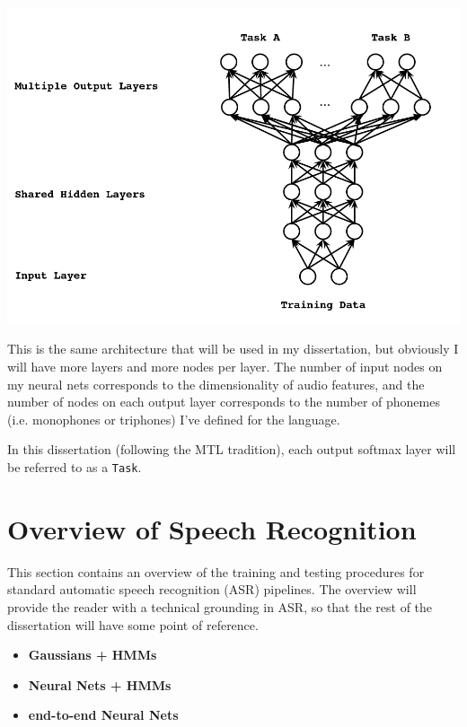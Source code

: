\documentclass[10pt,a4paper]{article}
\begin{document}
\begin{center}
\includegraphics[width=.85\textwidth,keepaspectratio]{figs/heigold-2013-dnn-c.png}
\end{center}

This is the same architecture that will be used in my dissertation, but obviously I will have more layers and more nodes per layer. The number of input nodes on my neural nets corresponds to the dimensionality of audio features, and the number of nodes on each output layer corresponds to the number of phonemes (i.e. monophones or triphones) I've defined for the language.

In this dissertation (following the MTL tradition), each output softmax layer will be referred to as a \texttt{Task}.
\section{Overview of Speech Recognition}

This section contains an overview of the training and testing procedures for standard automatic speech recognition (ASR) pipelines. The overview will provide the reader with a technical grounding in ASR, so that the rest of the dissertation will have some point of reference. 


\begin{itemize}

\item \textbf{Gaussians + HMMs}
  
\item \textbf{Neural Nets + HMMs}
  
\item \textbf{end-to-end Neural Nets}

\end{itemize}
\end{document}
